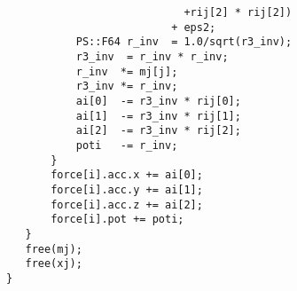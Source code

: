 \documentclass[10pt,twocolumn,a4paper,fleqn]{article}
\begin{document}
\begin{mdframed}[
    backgroundcolor=bg,
    topline=false,
    bottomline=false,
    leftline=false,
    rightline=false]
\begin{verbatim}
                            +rij[2] * rij[2])                                 
                          + eps2;                                             
           PS::F64 r_inv  = 1.0/sqrt(r3_inv);                                 
           r3_inv  = r_inv * r_inv;                                           
           r_inv  *= mj[j];                                                   
           r3_inv *= r_inv;                                                   
           ai[0]  -= r3_inv * rij[0];                                         
           ai[1]  -= r3_inv * rij[1];                                         
           ai[2]  -= r3_inv * rij[2];                                         
           poti   -= r_inv;                                                   
       }                                                                      
       force[i].acc.x += ai[0];        
       force[i].acc.y += ai[1];        
       force[i].acc.z += ai[2];        
       force[i].pot += poti;           
   }                                   
   free(mj);                           
   free(xj);                           
}                                       
\end{verbatim}
\end{mdframed}



\end{document}
